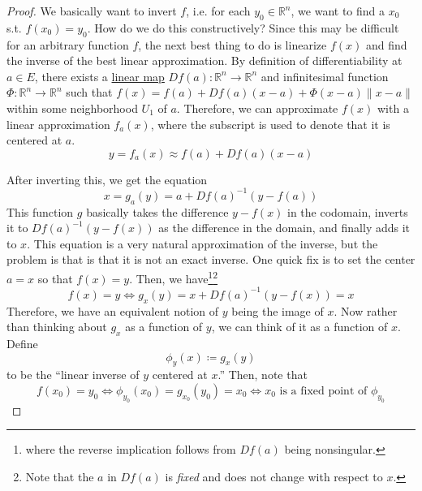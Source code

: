 	\begin{proof}
		We basically want to invert $f$, i.e. for each $y_0 \in \mathbb{R}^n$, we want to find a $x_0$ s.t. $f(x_0) = y_0$. How do we do this constructively? Since this may be difficult for an arbitrary function $f$, the next best thing to do is linearize $f(x)$ and find the inverse of the best linear approximation. By definition of differentiability at $a \in E$, there exists a \hyperref[lin-def:linear_map]{linear map} $Df(a): \mathbb{R}^n \to \mathbb{R}^n$ and infinitesimal function $\Phi: \mathbb{R}^n \to \mathbb{R}^n$ such that $f(x) = f(a) + Df(a) (x - a) + \Phi(x - a) \|x - a\|$ within some neighborhood $U_1$ of $a$. Therefore, we can approximate $f(x)$ with a linear approximation $f_a(x)$, where the subscript is used to denote that it is centered at $a$. 
		\begin{equation}
		  y = f_a(x) \approx f(a) + Df(a) (x - a)
		\end{equation} 
		
		After inverting this, we get the equation
		\begin{equation}
			x = g_{a} (y) = a + Df(a)^{-1} (y - f(a)) \label{eq:inv}
		\end{equation}
		This function $g$ basically takes the difference $y - f(x)$  in the codomain, inverts it to $Df(a)^{-1} (y - f(x))$ as the difference in the domain, and finally adds it to $x$. This equation is a very natural approximation of the inverse, but the problem is that is that it is not an exact inverse. One quick fix is to set the center $a = x$ so that $f(x) = y$. Then, we have\footnote{where the reverse implication follows from $Df(a)$ being nonsingular.}\footnote{Note that the $a$ in $Df(a)$ is \textit{fixed} and does not change with respect to $x$.}
		\begin{equation}
			f(x) = y \iff g_x (y) = x + Df(a)^{-1} (y - f(x)) = x
		\end{equation} 
		Therefore, we have an equivalent notion of $y$ being the image of $x$. Now rather than thinking about $g_x$ as a function of $y$, we can think of it as a function of $x$. Define 
		\begin{equation}
		  \phi_y (x) \coloneqq g_x (y)
		\end{equation} 
		to be the ``linear inverse of $y$ centered at $x$.'' Then, note that 
		\begin{equation}
			f(x_0) = y_0 \iff \phi_{y_0} (x_0) = g_{x_0} (y_0) = x_0 \iff x_0 \text{ is a fixed point of } \phi_{y_0}
		\end{equation}



\end{proof}
